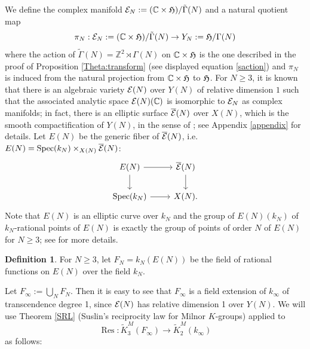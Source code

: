 \documentclass[12pt,amstex,amssymb]{article}
\theoremstyle{plain}
\theoremstyle{definition}
\newtheorem{definition}[theorem]{Definition}
\def\cE{{\cal E}}
\def\fH{{\frak H}}
\def\Z{{\mathbb Z}}
\def\C{{\mathbb C}}
\newcommand{\bea}{\begin{eqnarray}}
\newcommand{\eea}{\end{eqnarray}}
\newcommand{\Res}{\operatorname{Res}}
\newcommand{\Spec}{\operatorname{Spec}}
\begin{document}
We define the complex manifold $\cE_N:=(\C \times \fH)/ \tilde \Gamma(N)$ and a natural quotient map
\bea \label{univell}
\pi_N: \cE_N:=(\C \times \fH)/ \tilde \Gamma(N) \to Y_N:=\fH/\Gamma(N)
\eea
where the action of $\tilde \Gamma(N)=\Z^2 \rtimes \Gamma(N)$ on $\C \times \fH$ is the one described in the proof of Proposition \ref{Theta:transform} (see displayed equation \eqref{saction})
and $\pi_N$ is induced from the natural projection from $\C \times \fH$ to $\fH$. 
For $N\geq 3$, it is known that there is an algebraic variety $\cE(N)$ over $Y(N)$ of relative dimension $1$ such that the associated analytic space $\cE(N)(\C)$ is isomorphic to $\cE_N$ as complex manifolds; in fact, there is an elliptic surface $\overline \cE(N)$ over $X(N)$, which is the smooth compactification of $Y(N)$, in the sense of \cite[Definition on p. 202]{Silverman}; see Appendix \ref{appendix} for details.
Let $E(N)$ be the generic fiber of $\overline \cE(N)$, i.e. $E(N)=\Spec(k_N)\times_{X(N)}\overline \cE(N)$:
\[\begin{tikzcd}
	{E(N)} & {\overline \cE(N)} \\
	{\Spec(k_N)} & {X(N).}
	\arrow[" ", from=1-1, to=1-2]
	\arrow["{}"', from=1-1, to=2-1]
	\arrow[from=1-2, to=2-2]
	\arrow[" ", from=2-1, to=2-2]
\end{tikzcd}\]
Note that $E(N)$ is an elliptic curve over $k_N$ and the group of $E(N)(k_N)$ of $k_N$-rational points of $E(N)$ is exactly the group of points of order $N$ of $E(N)$ for $N\geq 3$; see \cite[Remark 5.5, Theorem 5.5]{Shioda} for more details.
\begin{definition} \label{fn}
For $N\geq 3$, let $F_N=k_N(E(N))$ be the field of rational functions on $E(N)$ over the field $k_N$. 
\end{definition}

Let $F_\infty:= \bigcup_{N} F_N$. Then it is easy to see that $F_\infty$ is a field extension of $k_\infty$ of transcendence degree 1, since $\cE(N)$ has relative dimension 1 over $Y(N)$.
We will use Theorem \eqref{SRL} (Suslin's reciprocity law for Milnor $K$-groups) applied to $$\Res: \tilde K^M_3(F_\infty) \to \tilde K^M_2(k_\infty)$$ 
as follows:
\end{document}
